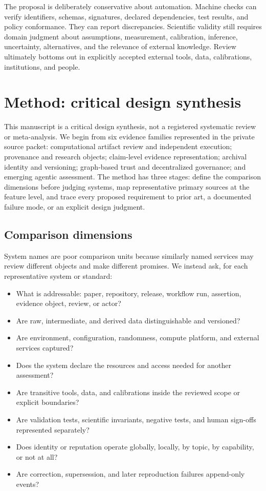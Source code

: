 \documentclass[11pt]{article}
\begin{document}
The proposal is deliberately conservative about automation. Machine checks can verify identifiers, schemas, signatures, declared dependencies, test results, and policy conformance. They can report discrepancies. Scientific validity still requires domain judgment about assumptions, measurement, calibration, inference, uncertainty, alternatives, and the relevance of external knowledge. Review ultimately bottoms out in explicitly accepted external tools, data, calibrations, institutions, and people.

\section{Method: critical design synthesis}
\label{sec:method}

This manuscript is a critical design synthesis, not a registered systematic review or meta-analysis. We begin from six evidence families represented in the private source packet: computational artifact review and independent execution; provenance and research objects; claim-level evidence representation; archival identity and versioning; graph-based trust and decentralized governance; and emerging agentic assessment. The method has three stages: define the comparison dimensions before judging systems, map representative primary sources at the feature level, and trace every proposed requirement to prior art, a documented failure mode, or an explicit design judgment.

\subsection{Comparison dimensions}

System names are poor comparison units because similarly named services may review different objects and make different promises. We instead ask, for each representative system or standard:

\begin{itemize}
  \item What is addressable: paper, repository, release, workflow run, assertion, evidence object, review, or actor?
  \item Are raw, intermediate, and derived data distinguishable and versioned?
  \item Are environment, configuration, randomness, compute platform, and external services captured?
  \item Does the system declare the resources and access needed for another assessment?
  \item Are transitive tools, data, and calibrations inside the reviewed scope or explicit boundaries?
  \item Are validation tests, scientific invariants, negative tests, and human sign-offs represented separately?
  \item Does identity or reputation operate globally, locally, by topic, by capability, or not at all?
  \item Are correction, supersession, and later reproduction failures append-only events?
\end{itemize}
\end{document}
